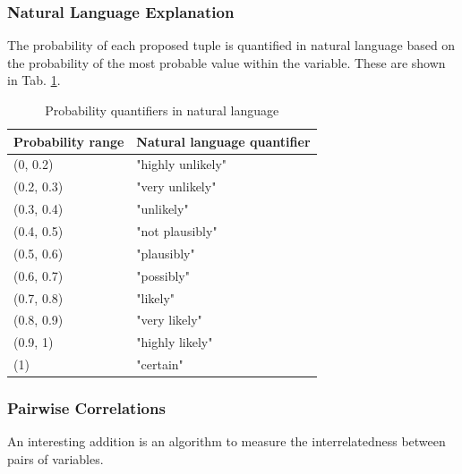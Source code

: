\subsubsection{Natural Language Explanation}
The probability of each proposed tuple is quantified in natural language based on the probability of the most probable value within the variable.
These are shown in Tab. \ref{tab:naturallanguageprobabilities}.

\begin{table}[htbp]
\caption{Probability quantifiers in natural language}
\begin{tabularx}{\textwidth}{@{} X X @{}}
\toprule 
Probability range & Natural language quantifier \\
\midrule 
(0, 0.2) &  "highly unlikely" \\
(0.2, 0.3) & "very unlikely" \\
(0.3, 0.4) & "unlikely" \\
(0.4, 0.5) & "not plausibly" \\
(0.5, 0.6) & "plausibly" \\
(0.6, 0.7) & "possibly" \\
(0.7, 0.8) & "likely" \\
(0.8, 0.9) & "very likely" \\
(0.9, 1) &  "highly likely" \\
(1) &  "certain" \\
\bottomrule
\end{tabularx}
\label{tab:naturallanguageprobabilities}
\end{table}


\subsubsection{Pairwise Correlations} 
An interesting addition is an algorithm to measure the interrelatedness between pairs of variables.

